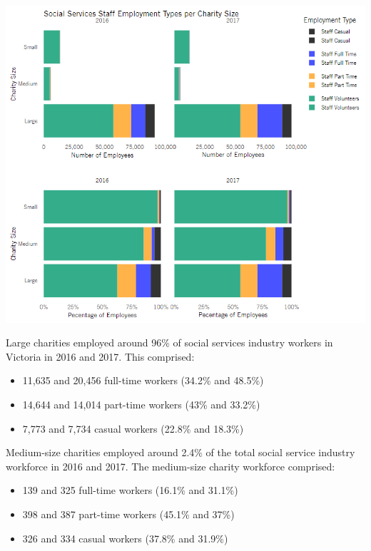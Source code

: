 \documentclass[
  11pt,
]{article}
\providecommand{\tightlist}{%
  \setlength{\itemsep}{0pt}\setlength{\parskip}{0pt}}
\let\origfigure\figure
\let\endorigfigure\endfigure
\renewenvironment{figure}[1][2] {
    \expandafter\origfigure\expandafter[H]
} {
    \endorigfigure
}
\begin{document}
\begin{figure}
\centering
\includegraphics{Fig4 CharSize EmployType.PNG}
\caption{Number of Workers in the Social Services Industry by Organisation Size and Employment Status}
\end{figure}

Large charities employed around 96\% of social services industry workers in Victoria in 2016 and 2017.
This comprised:

\begin{itemize}
\tightlist
\item
  11,635 and 20,456 full-time workers (34.2\% and 48.5\%)
\item
  14,644 and 14,014 part-time workers (43\% and 33.2\%)
\item
  7,773 and 7,734 casual workers (22.8\% and 18.3\%)
\end{itemize}

Medium-size charities employed around 2.4\% of the total social service industry workforce in 2016 and 2017. The medium-size charity workforce comprised:

\begin{itemize}
\tightlist
\item
  139 and 325 full-time workers (16.1\% and 31.1\%)
\item
  398 and 387 part-time workers (45.1\% and 37\%)
\item
  326 and 334 casual workers (37.8\% and 31.9\%)
\end{itemize}
\end{document}
